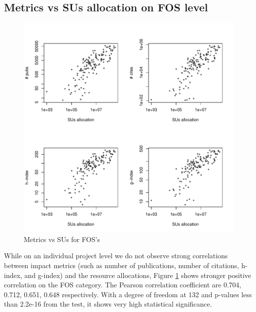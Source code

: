 \documentclass{sig-alternate}
\begin{document}
\subsection{Metrics vs SUs allocation on FOS level} 
 
\begin{figure}[htb] 
  \centering 
    \includegraphics[width=1.0\columnwidth]{images/03_metrics_vs_alloc_fos.pdf} 
  \caption{Metrics vs SUs for FOS’s}\label{F:metrics-vs-alloc-fos} 
\end{figure} 

While on an individual project level we do not observe strong correlations between impact metrics (such as number of publications, number of citations, h-index, and g-index) and the resource allocations, Figure \ref {F:metrics-vs-alloc-fos} shows stronger positive correlation on the FOS category. The Pearson correlation coefficient are 0.704, 0.712, 0.651, 0.648 respectively. With a degree of freedom at 132 and p-values less than 2.2e-16 from the test, it shows very high statistical significance.  
 
 
\end{document}
